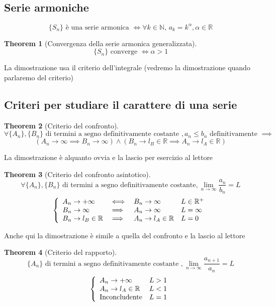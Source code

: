 \documentclass{article}
\newtheorem{theorem}{Theorem}[section]
\begin{document}
    \subsection{Serie armoniche}
        $$\{S_n\} \textrm{ è una serie armonica } \iff \forall k \in \mathbb{N}, \, a_k = k^\alpha, \alpha \in \mathbb{R}$$
        \begin{theorem}[Convergenza della serie armonica generalizzata]
                $$\{S_n\} \textrm{ converge } \iff \alpha > 1$$
        \end{theorem}
        La dimostrazione usa il criterio dell'integrale (vedremo la dimostrazione quando parlaremo del criterio)
    \subsection{Criteri per studiare il carattere di una serie}
        \begin{theorem}[Criterio del confronto]
            $$\forall \{A_n\}, \{B_n\} \textrm{ di termini a segno definitivamente costante }, a_n \leq b_n \textrm{ definitivamente } \implies$$
            $$\left(A_n \to \infty \implies B_n \to \infty\right) \land 
                \left(B_n \to l_B \in \mathbb{R} \implies A_n \to l_A \in \mathbb{R}\right)$$
        \end{theorem}
        La dimostrazione è alquanto ovvia e la lascio per esercizio al lettore
        \begin{theorem}[Criterio del confronto asintotico]
            $$\forall \{A_n\}, \{B_n\} \textrm{ di termini a segno definitivamente costante}, \lim_{n \to \infty }\frac{a_n}{b_n} = L$$
            \begin{equation}
                \left\{\begin{array}{l l l l}
                    A_n \to +\infty & \iff & B_n \to \infty & L \in \mathbb{R}^+ \\
                    B_n \to \infty & \implies & A_n \to \infty & L = \infty \\
                    B_n \to l_B \in \mathbb{R} & \implies & A_n \to l_A \in \mathbb{R} & L = 0 \\
                \end{array}\right.
            \end{equation}
        \end{theorem}
        Anche qui la dimostrazione è simile a quella del confronto e la lascio al lettore
        \begin{theorem}[Criterio del rapporto]
            $$\{A_n\} \textrm{ di termini a segno definitivamente costante }, \lim_{n \to \infty}\frac{a_{n+1}}{a_n} = L$$
            \begin{equation}
                \left\{\begin{array}{l l}
                    A_n \to +\infty & L > 1 \\
                    A_n \to l_A \in \mathbb{R} & L < 1 \\
                    \textrm{Inconcludente} & L = 1 \\
                \end{array}\right.
            \end{equation}
        \end{theorem}
\end{document}
